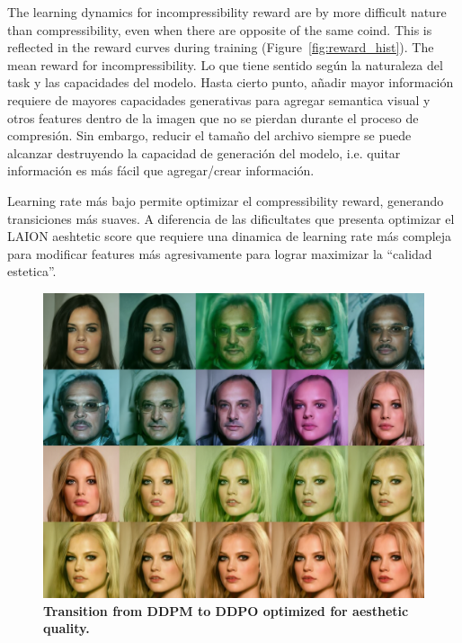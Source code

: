 \noindent The learning dynamics for incompressibility reward are by more
difficult nature than compressibility, even when there are opposite of the
same coind. This is reflected in the reward curves during training (Figure~\ref{fig:reward_hist}). The mean reward for incompressibility. Lo que tiene sentido según la naturaleza del task y las capacidades del modelo. Hasta cierto punto, añadir mayor información  requiere de mayores capacidades generativas para agregar semantica visual y  otros features dentro de la imagen que no se pierdan durante el proceso de compresión. Sin embargo, reducir el tamaño del archivo siempre se puede alcanzar destruyendo la capacidad de generación del modelo, i.e. quitar información es más fácil que agregar/crear información.

\noindent Learning rate más bajo permite optimizar el compressibility reward, generando transiciones más suaves. A diferencia de las dificultates que presenta optimizar el LAION aeshtetic score que requiere una dinamica de learning rate más compleja para modificar features más agresivamente para lograr maximizar la ``calidad estetica''. \\

\begin{figure}[ht]
  \centering
  \includegraphics[scale=1.40]{img/results/laion_60.png}
  \vspace{-0pt}  %
    \captionsetup{width=\textwidth} %
    \caption{\textbf{Transition from DDPM to DDPO optimized for aesthetic quality.}}
    \label{fig:ddpm-to-ddpo-aesthetic}
\end{figure}

